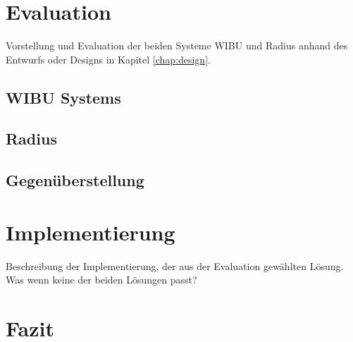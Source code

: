 \documentclass[11pt,a4paper]{report}
\begin{document}
\chapter{Evaluation} \label{chap:evaluation}

Vorstellung und Evaluation der beiden Systeme WIBU und Radius anhand des Entwurfs oder Designs in Kapitel \ref{chap:design}.

\section{WIBU Systems}

\section{Radius}

\section{Gegenüberstellung}

\chapter{Implementierung} \label{chap:implementation}

Beschreibung der Implementierung, der aus der Evaluation gewählten Lösung. Was wenn keine der beiden Lösungen passt?

\chapter{Fazit}
\end{document}
